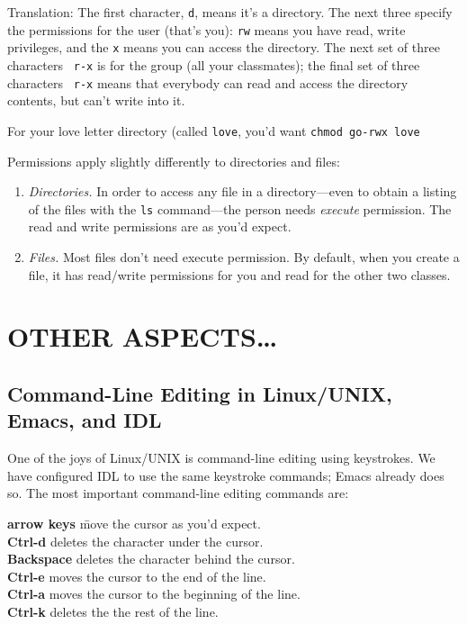 \documentclass[]{article}
\begin{document}
\noindent Translation: The first character, {\tt d}, means it's a
directory. The next three specify the permissions for the user (that's
you): {\tt rw} means you have read, write privileges, and the {\tt x} means
you can access the directory. The next set of three characters {\tt
  r-x} is for
the group (all your classmates); the final set of three characters {\tt
  r-x} means that everybody can read and access the directory contents,
but can't write into it.

For your love letter directory (called {\tt love}, you'd want {\tt chmod
  go-rwx love}

Permissions apply slightly differently to directories and files: \begin{enumerate} 

\item {\it Directories.} In order to access any file in a
  directory---even to obtain a listing of the files with the {\tt ls}
  command---the person needs {\it execute} permission. The read and
  write permissions are as you'd expect.

\item {\it Files.} Most files don't need execute permission. By
  default, when you create a file, it has read/write permissions for you
  and read for the other two classes.

\end{enumerate}

\section{OTHER ASPECTS\dots}


\subsection{Command-Line Editing in Linux/UNIX, Emacs, and IDL}

\label{keycommands}

One of the joys of Linux/UNIX is command-line editing using keystrokes. We have
configured IDL to use the same keystroke commands; Emacs already does so.
The most important command-line editing commands are:

\begin {tabbing}
{\bf arrow keys} \hspace{0.8in} \= move the cursor as you'd expect. \\
{\bf Ctrl-d} \> deletes the character under the cursor. \\
{\bf Backspace} \> deletes the character behind the cursor. \\
{\bf Ctrl-e} \> moves the cursor to the end of the line. \\
{\bf Ctrl-a} \> moves the cursor to the beginning of the line. \\
{\bf Ctrl-k} \> deletes the the rest of the line.
\end{tabbing}
\end{document}
